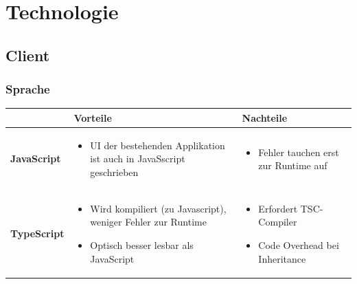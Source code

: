 \section{Technologie}
	\subsection{Client}
		\subsubsection{Sprache}
			\begin{tabularx}{\textwidth}{|lXX|}
				\hline
					\textbf{} & \textbf{Vorteile} & \textbf{Nachteile}\\
				\hline
					\textbf{JavaScript} & 
					\begin{itemize}
						\item UI der bestehenden Applikation ist auch in JavaSscript geschrieben
					\end{itemize} & 
					\begin{itemize}
						\item Fehler tauchen erst zur Runtime auf
					\end{itemize} \\
				\hline
					\textbf{TypeScript} &
					\begin{itemize}
						\item Wird kompiliert (zu Javascript), weniger Fehler zur Runtime
						\item Optisch besser lesbar als JavaScript
					\end{itemize} &
					\begin{itemize}
						\item Erfordert TSC-Compiler
						\item Code Overhead bei Inheritance
					\end{itemize} \\
				\hline
			\end{tabularx}
			
			
